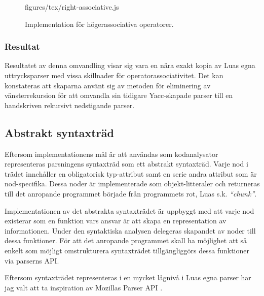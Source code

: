 \begin{figure}[ht]
    {figures/tex/right-associative.js}
  \caption{Implementation för högerassociativa operatorer.}
  \label{fig:rightassociative}
\end{figure}

\subsubsection{Resultat}

Resultatet av denna omvandling visar sig vara en nära exakt kopia av Luas egna
uttrycksparser med vissa skillnader för operatorassociativitet. Det kan
konstateras att skaparna använt sig av metoden för eliminering av
vänsterrekursion för att omvandla sin tidigare Yacc-skapade parser till en
handskriven rekursivt nedstigande parser.

\subsection{Abstrakt syntaxträd}

Eftersom implementationens mål är att användas som kodanalysator representeras
parsningens syntaxträd som ett abstrakt syntaxträd. Varje nod i trädet
innehåller en obligatorisk typ-attribut samt en serie andra attribut som är
nod-specifika. Dessa noder är implementerade som objekt-litteraler och
returneras till det anropande programmet började från programmets rot, Luas
s.k. \textit{``chunk''}.

Implementationen av det abstrakta syntaxträdet är uppbyggt med att varje nod
existerar som en funktion vars ansvar är att skapa en representation av
informationen. Under den syntaktiska analysen delegeras skapandet av noder
till dessa funktioner. För att det anropande programmet skall ha möjlighet att
så enkelt som möjligt omstrukturera syntaxträdet tillgängliggörs dessa
funktioner via parserns API.

Eftersom syntaxträdet representeras i en mycket lågnivå i Luas egna parser har
jag valt att ta inspiration av Mozillas Parser API \citep{parserapi}.


